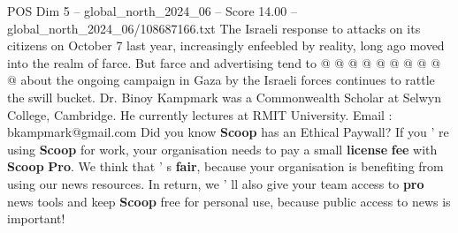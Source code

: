 \begin{textsample}{POS Dim 5 – global\_north\_2024\_06 – Score 14.00 – global\_north\_2024\_06/108687166.txt}
The Israeli response to attacks on its citizens on October 7 last year, increasingly enfeebled by reality, long ago moved into the realm of farce.
But farce and advertising tend to @ @ @ @ @ @ @ @ @ @ about the ongoing campaign in Gaza by the Israeli forces continues to rattle the swill bucket.
Dr.
Binoy Kampmark was a Commonwealth Scholar at Selwyn College, Cambridge.
He currently lectures at RMIT University.
Email : bkampmark@gmail.com Did you know \textbf{Scoop} has an Ethical Paywall?
If you ' re using \textbf{Scoop} for work, your organisation needs to pay a small \textbf{license} \textbf{fee} with \textbf{Scoop} \textbf{Pro}.
We think that ' s \textbf{fair}, because your organisation is benefiting from using our news resources.
In return, we ' ll also give your team access to \textbf{pro} news tools and keep \textbf{Scoop} free for personal use, because public access to news is important!

\end{textsample}
